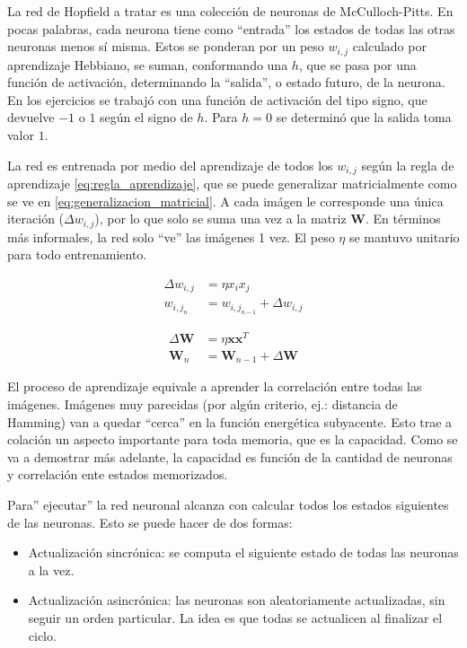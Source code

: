\documentclass[11pt]{article} %
\begin{document}
La red de Hopfield a tratar es una colección de neuronas de McCulloch-Pitts. En pocas palabras, cada neurona tiene como ``entrada'' los estados de todas las otras neuronas menos sí misma. Estos se ponderan por un peso $w_{i,j}$ calculado por aprendizaje Hebbiano, se suman, conformando una $h$, que se pasa por una función de activación, determinando la ``salida'', o estado futuro, de la neurona. En los ejercicios se trabajó con una función de activación del tipo signo, que devuelve $-1$ o $1$ según el signo de $h$. Para $h = 0$ se determinó que la salida toma valor $1$. 

La red es entrenada por medio del aprendizaje de todos los $w_{i,j}$ según la regla de aprendizaje \eqref{eq:regla_aprendizaje}, que se puede generalizar matricialmente como se ve en \eqref{eq:generalizacion_matricial}. A cada imágen le corresponde una única iteración ($\Delta w_{i,j}$), por lo que solo se suma una vez a la matriz $\mathbf{W}$. En términos más informales, la red solo ``ve'' las imágenes 1 vez.  El peso $\eta$ se mantuvo unitario para todo entrenamiento. 

\begin{equation}
\begin{split}
\Delta w_{i,j} &= \eta x_i x_j \\
w_{{i,j}_n} &= w_{{i,j} _{n-1}} + \Delta w_{i,j}
\end{split}
\label{eq:regla_aprendizaje}
\end{equation}

\begin{equation}
\begin{split}
\Delta\mathbf{W} &= \eta \mathbf{x} \mathbf{x}^T \\
\mathbf{W}_n &= \mathbf{W}_{n-1} + \Delta\mathbf{W}
\end{split}
\label{eq:generalizacion_matricial}
\end{equation}

El proceso de aprendizaje equivale a aprender la correlación entre todas las imágenes. Imágenes muy parecidas (por algún criterio, ej.: distancia de Hamming) van a quedar ``cerca'' en la función energética subyacente. Esto trae a colación un aspecto importante para toda memoria, que es la capacidad. Como se va a demostrar más adelante, la capacidad es función de la cantidad de neuronas y correlación ente estados memorizados. 

Para'' ejecutar'' la red neuronal alcanza con calcular todos los estados siguientes de las neuronas. Esto se puede hacer de dos formas:
\begin{itemize}
\item Actualización sincrónica: se computa el siguiente estado de todas las neuronas a la vez.
\item Actualización asincrónica: las neuronas son aleatoriamente actualizadas, sin seguir un orden particular. La idea es que todas se actualicen al finalizar el ciclo. 
\end{itemize}
\end{document}
